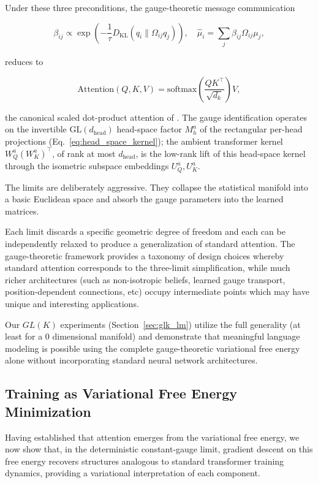 \documentclass[twoside,11pt]{article}
\begin{document}
Under these three preconditions, the gauge-theoretic message communication

\begin{equation}
\beta_{ij} \propto \exp\left(-\frac{1}{\tau}D_{\mathrm{KL}}(q_i \| \Omega_{ij} q_j)\right), \quad \hat\mu_i = \sum_j \beta_{ij} \Omega_{ij}\mu_j,
\end{equation}

reduces to

\begin{equation}
\boxed{\mathrm{Attention}(Q,K,V) = \mathrm{softmax}\left(\frac{QK^\top}{\sqrt{d_k}}\right)V},
\end{equation}

the canonical scaled dot-product attention of \citet{vaswani2017attention}. The gauge identification operates on the invertible $\mathrm{GL}(d_{\text{head}})$ head-space factor $M_h^a$ of the rectangular per-head projections (Eq.~\eqref{eq:head_space_kernel}); the ambient transformer kernel $W_Q^a (W_K^a)^\top$, of rank at most $d_{\text{head}}$, is the low-rank lift of this head-space kernel through the isometric subspace embeddings $U_Q^a, U_K^a$.

The limits are deliberately aggressive. They collapse the statistical manifold into a basic Euclidean space and absorb the gauge parameters into the learned matrices. 

Each limit discards a specific geometric degree of freedom and each can be independently relaxed to produce a generalization of standard attention. The gauge-theoretic framework provides a taxonomy of design choices whereby standard attention corresponds to the three-limit simplification, while much richer architectures (such as non-isotropic beliefs, learned gauge transport, position-dependent connections, etc) occupy intermediate points which may have unique and interesting applications. 

Our $GL(K)$ experiments (Section~\ref{sec:glk_lm}) utilize the full generality (at least for a $0$ dimensional manifold) and demonstrate that meaningful language modeling is possible using the complete gauge-theoretic variational free energy alone without incorporating standard neural network architectures.

\subsection{Training as Variational Free Energy Minimization}

Having established that attention emerges from the variational free energy, we now show that, in the deterministic constant-gauge limit, gradient descent on this free energy recovers structures analogous to standard transformer training dynamics, providing a variational interpretation of each component.
\end{document}
